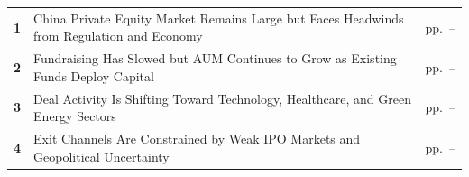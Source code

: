 \documentclass[10pt,a4paper]{article}
\begin{document}
\begin{tabularx}{\linewidth}{p{8mm}Yp{29mm}}
\textcolor{BOBlue}{\bfseries 1} & China Private Equity Market Remains Large but Faces Headwinds from Regulation and Economy & {\color{BOMuted}pp.~\pageref{chap:1}--\pageref{chap:1:end}} \\[3pt]
\textcolor{BOBlue}{\bfseries 2} & Fundraising Has Slowed but AUM Continues to Grow as Existing Funds Deploy Capital & {\color{BOMuted}pp.~\pageref{chap:2}--\pageref{chap:2:end}} \\[3pt]
\textcolor{BOBlue}{\bfseries 3} & Deal Activity Is Shifting Toward Technology, Healthcare, and Green Energy Sectors & {\color{BOMuted}pp.~\pageref{chap:3}--\pageref{chap:3:end}} \\[3pt]
\textcolor{BOBlue}{\bfseries 4} & Exit Channels Are Constrained by Weak IPO Markets and Geopolitical Uncertainty & {\color{BOMuted}pp.~\pageref{chap:4}--\pageref{chap:4:end}} \\[3pt]
\end{tabularx}
\clearpage
\end{document}
